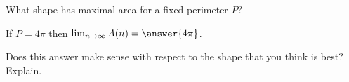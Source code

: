 \documentclass[handout,nooutcomes]{ximera}
\begin{document}
What shape has maximal area for a fixed perimeter $P$?
\begin{multipleChoice}
\end{multipleChoice}
If $P = 4\pi$ then $\lim_{n \to \infty} A(n) = \answer{4\pi}$.\\
\begin{freeResponse}
Does this answer make sense with respect to the shape that you think is best? Explain.
\end{freeResponse}
\end{document}
